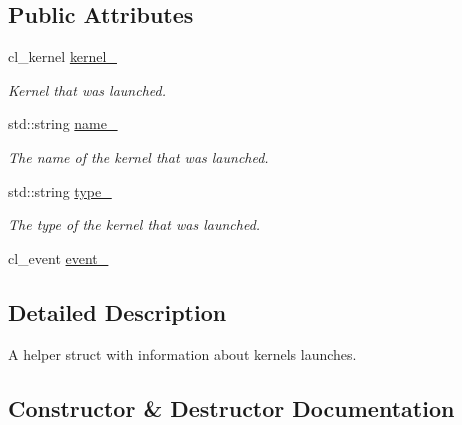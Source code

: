 \subsection*{Public Attributes}
\begin{DoxyCompactItemize}
\item 
\mbox{\label{structglow_1_1_kernel_launch_afc88188533704f9d1175297f059ffc8a}} 
cl\+\_\+kernel \hyperlink{structglow_1_1_kernel_launch_afc88188533704f9d1175297f059ffc8a}{kernel\+\_\+}
\begin{DoxyCompactList}\small\item\em Kernel that was launched. \end{DoxyCompactList}\item 
\mbox{\label{structglow_1_1_kernel_launch_ada2e5b50337745f7738b7fd8f7ee851f}} 
std\+::string \hyperlink{structglow_1_1_kernel_launch_ada2e5b50337745f7738b7fd8f7ee851f}{name\+\_\+}
\begin{DoxyCompactList}\small\item\em The name of the kernel that was launched. \end{DoxyCompactList}\item 
\mbox{\label{structglow_1_1_kernel_launch_a5e6002fae69fd7a59ea729ff0689ac95}} 
std\+::string \hyperlink{structglow_1_1_kernel_launch_a5e6002fae69fd7a59ea729ff0689ac95}{type\+\_\+}
\begin{DoxyCompactList}\small\item\em The type of the kernel that was launched. \end{DoxyCompactList}\item 
cl\+\_\+event \hyperlink{structglow_1_1_kernel_launch_a2f84c430a76b24b6e12a32812a00db8c}{event\+\_\+}
\end{DoxyCompactItemize}


\subsection{Detailed Description}
A helper struct with information about kernels launches. 

\subsection{Constructor \& Destructor Documentation}
\mbox{\label{structglow_1_1_kernel_launch_a48a8021551c969a239135dcf3ea403d5}} 
